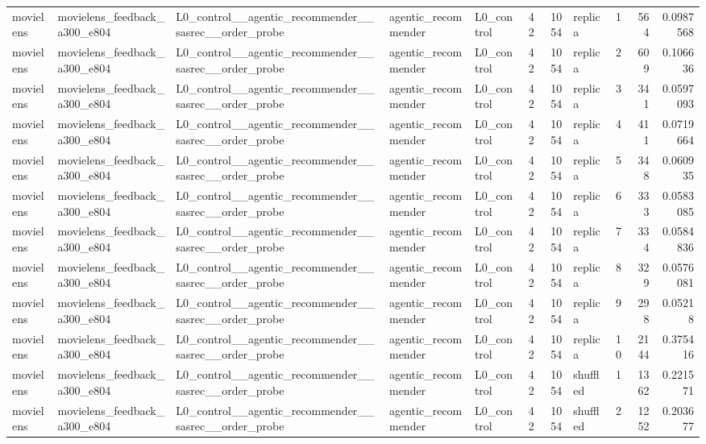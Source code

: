 \begin{table}[htbp!]
\begin{tabular}{lllllrrlrrr}
movielens & movielens\_feedback\_a300\_e804 & L0\_control\_\_agentic\_recommender\_\_sasrec\_\_order\_probe & agentic\_recommender & L0\_control & 42 & 1054 & replica & 1 & 564 & 0.0987568 \\
movielens & movielens\_feedback\_a300\_e804 & L0\_control\_\_agentic\_recommender\_\_sasrec\_\_order\_probe & agentic\_recommender & L0\_control & 42 & 1054 & replica & 2 & 609 & 0.106636 \\
movielens & movielens\_feedback\_a300\_e804 & L0\_control\_\_agentic\_recommender\_\_sasrec\_\_order\_probe & agentic\_recommender & L0\_control & 42 & 1054 & replica & 3 & 341 & 0.0597093 \\
movielens & movielens\_feedback\_a300\_e804 & L0\_control\_\_agentic\_recommender\_\_sasrec\_\_order\_probe & agentic\_recommender & L0\_control & 42 & 1054 & replica & 4 & 411 & 0.0719664 \\
movielens & movielens\_feedback\_a300\_e804 & L0\_control\_\_agentic\_recommender\_\_sasrec\_\_order\_probe & agentic\_recommender & L0\_control & 42 & 1054 & replica & 5 & 348 & 0.060935 \\
movielens & movielens\_feedback\_a300\_e804 & L0\_control\_\_agentic\_recommender\_\_sasrec\_\_order\_probe & agentic\_recommender & L0\_control & 42 & 1054 & replica & 6 & 333 & 0.0583085 \\
movielens & movielens\_feedback\_a300\_e804 & L0\_control\_\_agentic\_recommender\_\_sasrec\_\_order\_probe & agentic\_recommender & L0\_control & 42 & 1054 & replica & 7 & 334 & 0.0584836 \\
movielens & movielens\_feedback\_a300\_e804 & L0\_control\_\_agentic\_recommender\_\_sasrec\_\_order\_probe & agentic\_recommender & L0\_control & 42 & 1054 & replica & 8 & 329 & 0.0576081 \\
movielens & movielens\_feedback\_a300\_e804 & L0\_control\_\_agentic\_recommender\_\_sasrec\_\_order\_probe & agentic\_recommender & L0\_control & 42 & 1054 & replica & 9 & 298 & 0.05218 \\
movielens & movielens\_feedback\_a300\_e804 & L0\_control\_\_agentic\_recommender\_\_sasrec\_\_order\_probe & agentic\_recommender & L0\_control & 42 & 1054 & replica & 10 & 2144 & 0.375416 \\
movielens & movielens\_feedback\_a300\_e804 & L0\_control\_\_agentic\_recommender\_\_sasrec\_\_order\_probe & agentic\_recommender & L0\_control & 42 & 1054 & shuffled & 1 & 1362 & 0.221571 \\
movielens & movielens\_feedback\_a300\_e804 & L0\_control\_\_agentic\_recommender\_\_sasrec\_\_order\_probe & agentic\_recommender & L0\_control & 42 & 1054 & shuffled & 2 & 1252 & 0.203677 \\

\end{tabular}
\end{table}
